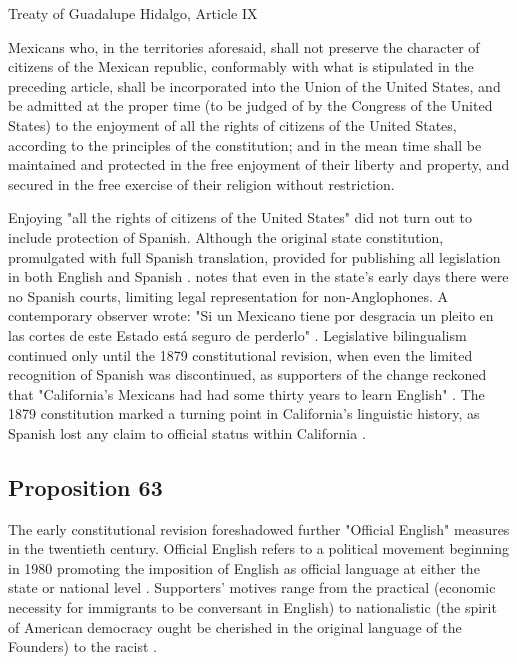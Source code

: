 \begin{aquote}{Treaty of Guadalupe Hidalgo, Article IX \parencite{guadalupe}}

	Mexicans who, in the territories aforesaid, shall not preserve the character
	of citizens of the Mexican republic, conformably with what is stipulated in
	the preceding article, shall be incorporated into the Union of the United
	States, and be admitted at the proper time (to be judged of by the Congress
	of the United States) to the enjoyment of all the rights of citizens of the
	United States, according to the principles of the constitution; and in the
	mean time shall be maintained and protected in the free enjoyment of their
	liberty and property, and secured in the free exercise of their religion
	without restriction.

\end{aquote}

Enjoying "all the rights of citizens of the United States" did not turn out to
include protection of Spanish. Although the original state constitution,
promulgated with full Spanish translation, provided for publishing all
legislation in both English and Spanish \parencite{baron92}.
\textcite{lamar-prieto14} notes that even in the state's early days there were
no Spanish courts, limiting legal representation for non-Anglophones. A
contemporary observer wrote: "Si un Mexicano tiene por desgracia un pleito en
las cortes de este Estado está seguro de perderlo"
\parencite[28]{lamar-prieto14}. Legislative bilingualism continued only until
the 1879 constitutional revision, when even the limited recognition of Spanish
was discontinued, as supporters of the change reckoned that "California's
Mexicans had had some thirty years to learn English" \parencite[]{baron92}. The
1879 constitution marked a turning point in California's linguistic history, as
Spanish lost any claim to official status within California
\parencite{baron92}.

\subsection{Proposition 63}

The early constitutional revision foreshadowed further "Official English"
measures in the twentieth century. Official English refers to a political
movement beginning in 1980 promoting the imposition of English as official
language at either the state or national level \parencite{liu14}. Supporters'
motives range from the practical (economic necessity for immigrants to be
conversant in English) to nationalistic (the spirit of American democracy ought
be cherished in the original language of the Founders) to the racist
\parencite[7]{baron92}.

